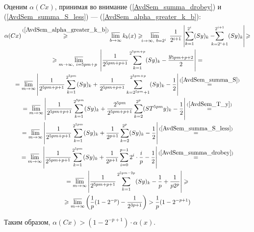 Оценим $\alpha(Cx)$, принимая во внимание
(\ref{AvdSem_summa_drobey}) и (\ref{AvdSem_summa_S_less}) ---
(\ref{AvdSem_alpha_greater_k_b}):
\begin{multline*}
    \alpha (Cx) \mathop{\geqslant}^{(\ref{AvdSem_alpha_greater_k_b})}
    \varlimsup_{b\to \infty} k_b(x) \geqslant
    \!\!\!
    \varlimsup_{
        i\to \infty,~
        b=2^i~
    }\frac{1}{2^{i+1}}\left|
        \sum_{k=1}^{2^i}(Sy)_k -
        \!\!\!\!\!
        \sum_{k=2^i+1}^{2^{i+1}}(Sy)_k
    \right|
    \!
    \geqslant
    \\ \geqslant
    \varlimsup_{
        m\to \infty,~
        i=5pm+p~
    }\left|
        \frac{1}{2^{5pm+p+1}}\sum_{k=1}^{2^{5pm+p}}(Sy)_k - \frac{y_{5pm+p+2}}{2}
    \right| =
    \\=
    \varlimsup_{m\to \infty}\left|
        \frac{1}{2^{5pm+p+1}}\sum_{k=1}^{2^{5pm}}(Sy)_k
        +
        \frac{1}{2^{5pm+p+1}}\sum_{k=2^{5pm}+1}^{2^{5pm+p}}(Sy)_k
        - \frac{1}{2}
    \right|
    \mathop{=}^{(\ref{AvdSem_summa_S})}
    \\=
    \varlimsup_{m\to \infty}\left|
        \frac{1}{2^{5pm+p+1}}\sum_{k=1}^{2^{5pm}}(Sy)_k
        +
        \frac{2^{5pm}}{2^{5pm+p+1}} \sum_{k=2}^{2^p}(ST^{5pm}y)_k
        - \frac{1}{2}
    \right|
    \mathop{=}^{(\ref{AvdSem_T_y})}
    \\=
    \varlimsup_{m\to \infty}\left|
        \frac{1}{2^{5pm+p+1}}\sum_{k=1}^{2^{5pm}}(Sy)_k
        +
        \frac{1}{2^{p+1}} \sum_{k=2}^{2^p}(Sy)_k
        - \frac{1}{2}
    \right|
    \mathop{=}^{(\ref{AvdSem_summa_S_less})}
    \\=
    \varlimsup_{m\to \infty}\left|
        \frac{1}{2^{5pm+p+1}}\sum_{k=1}^{2^{5pm}}(Sy)_k
        +
        \frac{1}{2^{p+1}} \sum_{i=0}^{p-1}2^i \cdot \frac{i}{p}
        - \frac{1}{2}
    \right|
    \mathop{=}^{(\ref{AvdSem_summa_drobey})}
    \\=
    \varlimsup_{m\to \infty}\left|
        \frac{1}{2^{5pm+p+1}}\sum_{k=1}^{2^{5pm-2p}}(Sy)_k
        -\frac{1}{p} + \frac{1}{p 2^p}
    \right| \geqslant
    \\ \geqslant
    \varlimsup_{m\to \infty} \left(
        \frac{1}{p} (1-2^{-p})
        - \frac{1}{2^{3p+1}}
    \right) >
    \frac{1}{p} (1-2^{-p+1})
\end{multline*}


Таким образом, $
    \alpha(Cx) >
    (1-2^{-p+1}) \cdot \alpha(x)
$.
